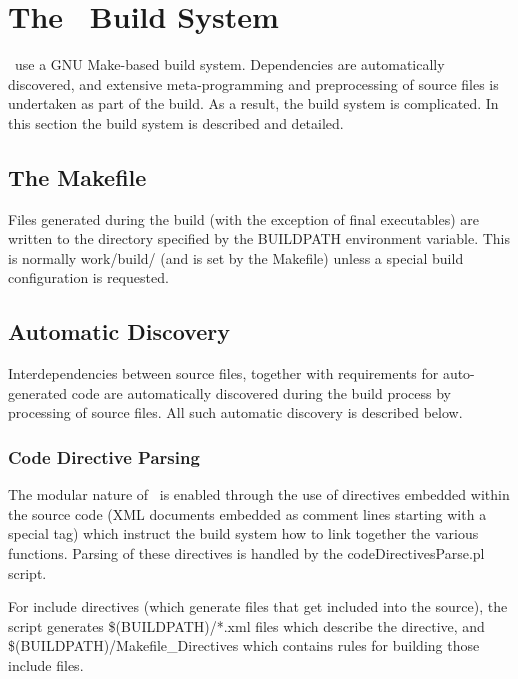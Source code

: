 \section{The \glc\ Build System}

\glc\ use a GNU Make-based build system. Dependencies are automatically discovered, and extensive meta-programming and preprocessing of source files is undertaken as part of the build. As a result, the build system is complicated. In this section the build system is described and detailed.

\subsection{The Makefile}

Files generated during the build (with the exception of final executables) are written to the directory specified by the {\normalfont \ttfamily BUILDPATH} environment variable. This is normally {\normalfont \ttfamily work/build/} (and is set by the {\normalfont \ttfamily Makefile}) unless a special build configuration is requested.

\subsection{Automatic Discovery}

Interdependencies between source files, together with requirements for auto-generated code are automatically discovered during the build process by processing of source files. All such automatic discovery is described below.

\subsubsection{Code Directive Parsing}\label{sec:buildDiscoveryDirectives}

The modular nature of \glc\ is enabled through the use of directives embedded within the source code (XML documents embedded as comment lines starting with a special tag) which instruct the build system how to link together the various functions. Parsing of these directives is handled by the {\normalfont \ttfamily codeDirectivesParse.pl} script.

For {\normalfont \ttfamily include} directives (which generate files that get included into the source), the script generates {\normalfont \ttfamily \$(BUILDPATH)/*.xml} files which describe the directive, and {\normalfont \ttfamily \$(BUILDPATH)/Makefile\_Directives} which contains rules for building those include files.


